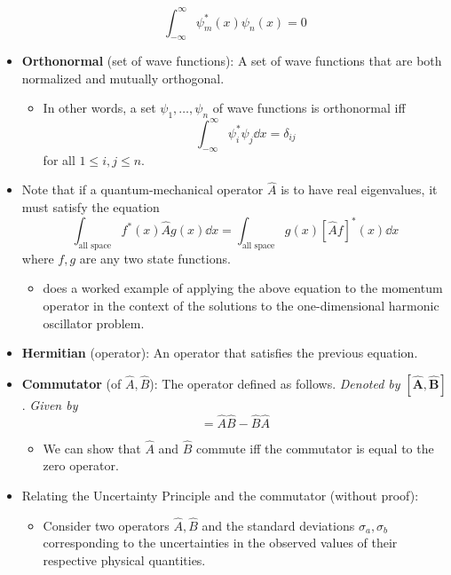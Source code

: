 \documentclass[../notes.tex]{subfiles}
\begin{document}
\begin{itemize}
    \begin{equation*}
        \int_{-\infty}^\infty\psi_m^*(x)\psi_n(x) = 0
    \end{equation*}
    \item \textbf{Orthonormal} (set of wave functions): A set of wave functions that are both normalized and mutually orthogonal.
    \begin{itemize}
        \item In other words, a set $\psi_1,\dots,\psi_n$ of wave functions is orthonormal iff
        \begin{equation*}
            \int_{-\infty}^\infty\psi_i^*\psi_j\dd{x} = \delta_{ij}
        \end{equation*}
        for all $1\leq i,j\leq n$.
    \end{itemize}
    \item Note that if a quantum-mechanical operator $\hat{A}$ is to have real eigenvalues, it must satisfy the equation
    \begin{equation*}
        \int_\text{all space}f^*(x)\hat{A}g(x)\dd{x} = \int_\text{all space}g(x)[\hat{A}f]^*(x)\dd{x}
    \end{equation*}
    where $f,g$ are any two state functions.
    \begin{itemize}
        \item \textcite{bib:McQuarrieSimon} does a worked example of applying the above equation to the momentum operator in the context of the solutions to the one-dimensional harmonic oscillator problem.
    \end{itemize}
    \item \textbf{Hermitian} (operator): An operator that satisfies the previous equation.
    \item \textbf{Commutator} (of $\hat{A},\hat{B}$): The operator defined as follows. \emph{Denoted by} $\bm{[\hat{A},\hat{B}]}$. \emph{Given by}
    \begin{equation*}
        [\hat{A},\hat{B}] = \hat{A}\hat{B}-\hat{B}\hat{A}
    \end{equation*}
    \begin{itemize}
        \item We can show that $\hat{A}$ and $\hat{B}$ commute iff the commutator is equal to the zero operator.
    \end{itemize}
    \item Relating the Uncertainty Principle and the commutator (without proof):
    \begin{itemize}
        \item Consider two operators $\hat{A},\hat{B}$ and the standard deviations $\sigma_a,\sigma_b$ corresponding to the uncertainties in the observed values of their respective physical quantities.

\end{itemize}
\end{itemize}
\end{document}
